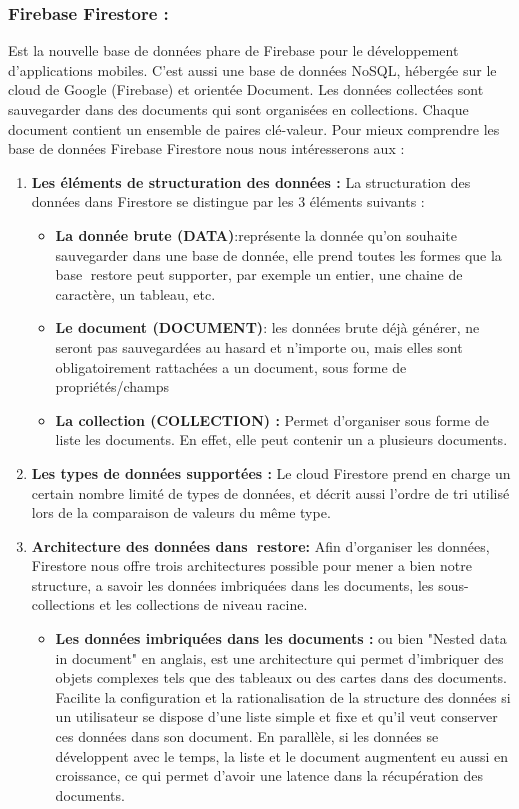 \subsubsection{Firebase Firestore :}
Est la nouvelle base de données phare de Firebase pour le développement d'applications mobiles. C'est aussi une base de données NoSQL, hébergée sur le cloud de Google (Firebase) et orientée Document. Les données collectées sont sauvegarder dans des documents qui sont organisées en collections. Chaque document contient un ensemble de paires clé-valeur. 
Pour mieux comprendre les base de données Firebase Firestore nous nous intéresserons aux :
\begin{enumerate}
\item \textbf{Les éléments de structuration des données :} 
La structuration des données dans Firestore se distingue par les 3 éléments suivants :

\begin{itemize}
\item \textbf{La donnée brute (DATA)}:représente la donnée qu'on souhaite sauvegarder dans une base de donnée, elle prend toutes les formes que la base restore peut supporter, par exemple un entier, une chaine de caractère, un tableau, etc.
\item \textbf{Le document (DOCUMENT)}: les données brute déjà générer, ne seront pas sauvegardées au hasard et n'importe ou, mais elles sont obligatoirement rattachées a un document, sous forme de propriétés/champs
\item \textbf{La collection (COLLECTION) :} Permet d'organiser sous forme de liste les documents. En effet, elle peut contenir un a plusieurs documents.
\end{itemize}
\item \textbf{Les types de données supportées :}
Le cloud Firestore prend en charge un certain nombre limité de types de données, et décrit aussi l'ordre de tri utilisé lors de la comparaison de valeurs du même type.
\item \textbf{Architecture des données dans restore:} 
Afin d'organiser les données, Firestore nous offre trois architectures possible pour mener a bien notre structure, a savoir les données imbriquées dans les documents, les sous-collections et les collections de niveau racine.

\begin{itemize}
\item \textbf{Les données imbriquées dans les documents :}
ou bien "Nested data in document" en anglais, est une architecture qui permet d'imbriquer des objets complexes tels que des tableaux ou des cartes dans des documents.
Facilite la configuration et la rationalisation de la structure des données si un utilisateur se dispose d'une liste simple et fixe et qu'il veut conserver ces données dans son document. En parallèle, si les données se développent avec le temps, la liste et le document augmentent eu aussi en croissance, ce qui permet d'avoir une latence dans la récupération des documents.


\end{itemize}
\end{enumerate}
